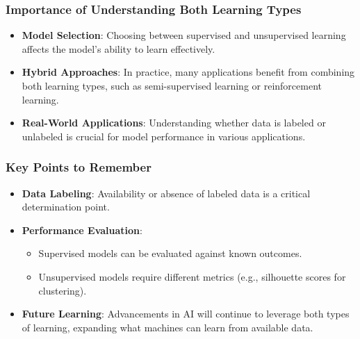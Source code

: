 \documentclass[aspectratio=169]{beamer}
\begin{document}
\begin{frame}[fragile]
    \frametitle{Importance of Understanding Both Learning Types}
    \begin{itemize}
        \item \textbf{Model Selection}: Choosing between supervised and unsupervised learning affects the model's ability to learn effectively.
        \item \textbf{Hybrid Approaches}: In practice, many applications benefit from combining both learning types, such as semi-supervised learning or reinforcement learning.
        \item \textbf{Real-World Applications}: Understanding whether data is labeled or unlabeled is crucial for model performance in various applications.
    \end{itemize}
\end{frame}

\begin{frame}[fragile]
    \frametitle{Key Points to Remember}
    \begin{itemize}
        \item \textbf{Data Labeling}: Availability or absence of labeled data is a critical determination point.
        \item \textbf{Performance Evaluation}: 
        \begin{itemize}
            \item Supervised models can be evaluated against known outcomes.
            \item Unsupervised models require different metrics (e.g., silhouette scores for clustering).
        \end{itemize}
        \item \textbf{Future Learning}: Advancements in AI will continue to leverage both types of learning, expanding what machines can learn from available data.
    \end{itemize}
\end{frame}
\end{document}
